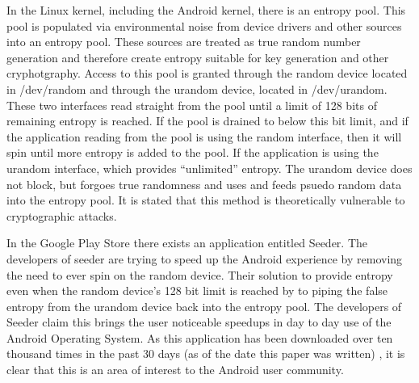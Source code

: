 \documentclass[conference]{IEEEtran}
\begin{document}
In the Linux kernel, including the Android kernel, there is an entropy pool. This pool is populated via environmental noise from device drivers and other 
sources into an entropy pool. These sources are treated as true random number generation and therefore create entropy suitable for key generation and other
cryphotgraphy. Access to this pool is granted through the random device located in /dev/random \cite{random_man} and through the urandom device, 
located in /dev/urandom. These two interfaces read straight from the pool until a limit of 128 bits of remaining entropy is reached. If the pool is drained to below this bit limit, and if the application reading from the pool is using the random interface, then it will spin until more entropy is added to the pool. If the application is using the urandom interface, which provides ``unlimited'' entropy. The urandom device does not block, but forgoes true randomness and uses and feeds psuedo random data into the entropy pool. It is stated that this method is theoretically vulnerable to cryptographic attacks. 

In the Google Play Store there exists an application entitled Seeder. The developers of seeder are trying to speed up the Android experience by removing
the need to ever spin on the random device. Their solution to provide entropy even when the random device's 128 bit limit is reached by to piping the 
false entropy from the urandom device back into the entropy pool. The developers of Seeder claim this brings the user noticeable speedups in day to 
day use of the Android Operating System. As this application has been downloaded over ten thousand times in the past 30 days (as of the date this paper was written)
, it is clear that this is an area of interest to the Android user community.
\end{document}
